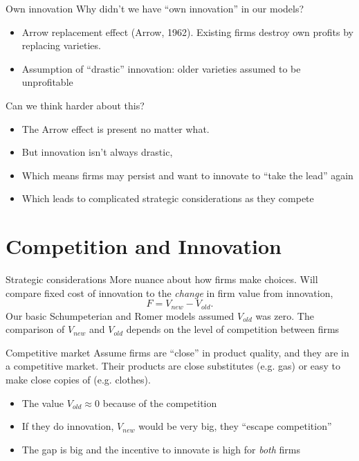 \begin{frame}{Own innovation}
Why didn't we have ``own innovation'' in our models?
\begin{itemize}
	\item Arrow replacement effect (Arrow, 1962). Existing firms destroy own profits by replacing varieties.
	\item Assumption of ``drastic'' innovation: older varieties assumed to be unprofitable
\end{itemize}
Can we think harder about this?
\begin{itemize}
	\item The Arrow effect is present no matter what.
	\item But innovation isn't always drastic,
	\item Which means firms may persist and want to innovate to ``take the lead'' again
	\item Which leads to complicated strategic considerations as they compete
\end{itemize}
\end{frame}

\section{Competition and Innovation}
\begin{frame}{Strategic considerations}
More nuance about how firms make choices. Will compare fixed cost of innovation to the \textit{change} in firm value from innovation,
\begin{equation}
	F = V_{new} - V_{old}.
\end{equation}
Our basic Schumpeterian and Romer models assumed $V_{old}$ was zero. 
\vspace{.25in}\noindent
The comparison of $V_{new}$ and $V_{old}$ depends on the level of competition between firms

\end{frame}

\begin{frame}{Competitive market}
Assume firms are ``close'' in product quality, and they are in a competitive market. Their products are close substitutes (e.g. gas) or easy to make close copies of (e.g. clothes). 
\begin{itemize}
	\item The value $V_{old} \approx 0$ because of the competition
	\item If they do innovation, $V_{new}$ would be very big, they ``escape competition''
	\item The gap is big and the incentive to innovate is high for \textit{both} firms
\end{itemize}
\end{frame}

